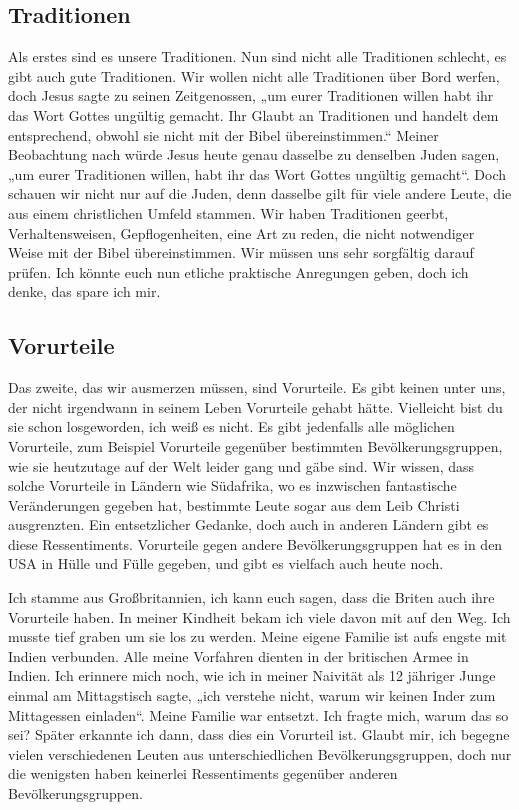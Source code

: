 \subsection{Traditionen}

Als erstes sind es unsere Traditionen.
Nun sind nicht alle Traditionen schlecht, es gibt auch gute Traditionen.
Wir wollen nicht alle Traditionen über Bord werfen, doch Jesus sagte zu seinen Zeitgenossen, „um eurer Traditionen willen habt ihr das Wort Gottes ungültig gemacht. Ihr Glaubt an Traditionen und handelt dem entsprechend, obwohl sie nicht mit der Bibel übereinstimmen.“
Meiner Beobachtung nach würde Jesus heute genau dasselbe zu denselben Juden sagen, „um eurer Traditionen willen, habt ihr das Wort Gottes ungültig gemacht“.
Doch schauen wir nicht nur auf die Juden, denn dasselbe gilt für viele andere Leute, die aus einem christlichen Umfeld stammen.
Wir haben Traditionen geerbt, Verhaltensweisen, Gepflogenheiten, eine Art zu reden, die nicht notwendiger Weise mit der Bibel übereinstimmen.
Wir müssen uns sehr sorgfältig darauf prüfen.
Ich könnte euch nun etliche praktische Anregungen geben, doch ich denke, das spare ich mir.

\subsection{Vorurteile}

Das zweite, das wir ausmerzen müssen, sind Vorurteile.
Es gibt keinen unter uns, der nicht irgendwann in seinem Leben Vorurteile gehabt hätte. Vielleicht bist du sie schon losgeworden, ich weiß es nicht.
Es gibt jedenfalls alle möglichen Vorurteile, zum Beispiel Vorurteile gegenüber bestimmten Bevölkerungsgruppen, wie sie heutzutage auf der Welt leider gang und gäbe sind.
Wir wissen, dass solche Vorurteile in Ländern wie Südafrika, wo es inzwischen fantastische Veränderungen gegeben hat, bestimmte Leute sogar aus dem Leib Christi ausgrenzten.
Ein entsetzlicher Gedanke, doch auch in anderen Ländern gibt es diese Ressentiments.
Vorurteile gegen andere Bevölkerungsgruppen hat es in den USA in Hülle und Fülle gegeben, und gibt es vielfach auch heute noch.

Ich stamme aus Großbritannien, ich kann euch sagen, dass die Briten auch ihre Vorurteile haben.
In meiner Kindheit bekam ich viele davon mit auf den Weg. Ich musste tief graben um sie los zu werden.
Meine eigene Familie ist aufs engste mit Indien verbunden.
Alle meine Vorfahren dienten in der britischen Armee in Indien.
Ich erinnere mich noch, wie ich in meiner Naivität als 12 jähriger Junge einmal am Mittagstisch sagte, „ich verstehe nicht, warum wir keinen Inder zum Mittagessen einladen“. Meine Familie war entsetzt.
Ich fragte mich, warum das so sei? Später erkannte ich dann, dass dies ein Vorurteil ist.
Glaubt mir, ich begegne vielen verschiedenen Leuten aus unterschiedlichen Bevölkerungsgruppen, doch nur die wenigsten haben keinerlei Ressentiments gegenüber anderen Bevölkerungsgruppen.

